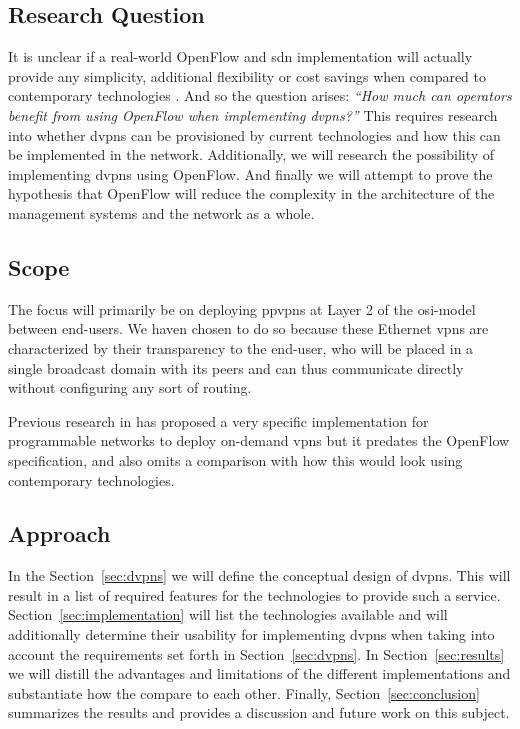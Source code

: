 	\subsection{Research Question} %
	\label{sub:research_question}
	It is unclear if a real-world OpenFlow and \ac{sdn} implementation will actually provide any simplicity, additional flexibility or cost savings when compared to contemporary technologies \cite{programmability-answer}. And so the question arises: \textsl{``How much can operators benefit from using OpenFlow when implementing \aclp{dvpn}?''} 
	This requires research into whether \acp{dvpn} can be provisioned by current technologies and how this can be implemented in the network. Additionally, we will research the possibility of implementing \acp{dvpn} using OpenFlow. And finally we will attempt to prove the hypothesis that OpenFlow will reduce the complexity in the architecture of the management systems and the network as a whole.


	\subsection{Scope} %
	\label{sub:scope}
	The focus will primarily be on deploying \acp{ppvpn} at Layer 2 of the \acs{osi}-model between end-users. We haven chosen to do so because these Ethernet \acp{vpn} are characterized by their transparency to the end-user, who will be placed in a single broadcast domain with its peers and can thus communicate directly without configuring any sort of routing.
	
	Previous research in \cite{net-prog-vpn} has proposed a very specific implementation for programmable networks to deploy on-demand \acp{vpn} but it predates the OpenFlow specification, and also omits a comparison with how this would look using contemporary technologies.


	\subsection{Approach} %
	\label{sub:approach}
	In the Section~\ref{sec:dvpns} we will define the conceptual design of \acp{dvpn}. This will result in a list of required features for the technologies to provide such a service. Section~\ref{sec:implementation} will list the technologies available and will additionally determine their usability for implementing \acp{dvpn} when taking into account the requirements set forth in Section~\ref{sec:dvpns}. In Section~\ref{sec:results} we will distill the advantages and limitations of the different implementations and substantiate how the compare to each other. Finally, Section~\ref{sec:conclusion} summarizes the results and provides a discussion and future work on this subject.


